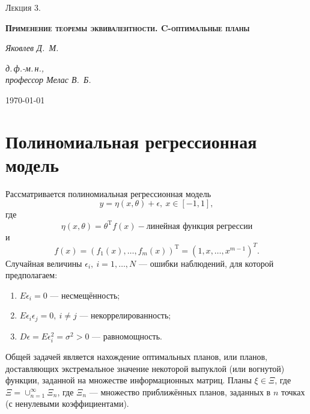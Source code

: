 \documentclass[12pt, a4paper]{article}
\begin{document}
	\begin{titlepage}
		\centering
		{\LARGE \textsc{Лекция 3.}\par}
		\vspace{1cm}
		{\Large \bfseries\textsc{Применение теоремы эквивалентности. C-оптимальные планы}\par}
		\vspace{1.5cm}
		{\Large\itshape Яковлев Д.~М.\par}
		\vspace{1cm}
		{\Large\itshape д.\,ф.-м.\,н.,\\профессор Мелас В.~Б.}
		\vfill
		
		{\large \today\par}
	\end{titlepage}
	\tableofcontents
	\newpage
	\section{Полиномиальная регрессионная модель}
	Рассматривается полиномиальная регрессионная модель
	\begin{equation*}
		y=\eta(x,\theta) + \epsilon,~x\in[-1, 1],
	\end{equation*}
	где
	\begin{equation*}
		\eta(x, \theta) = \theta^\mathrm{T}f(x) - \text{линейная функция регрессии}
	\end{equation*}
	и
	\begin{equation*}
		f(x)=( f_1(x),\dots, f_m(x))^\mathrm{T}=(1, x,\dots,x^{m-1})^T.
	\end{equation*}
	Случайная величины $\epsilon_i, ~i=1,\dots,N$ --- ошибки наблюдений, для которой предполагаем:
	\begin{enumerate}
		\item $E\epsilon_i = 0$ --- несмещённость;
		\item $E\epsilon_i\epsilon_j = 0,~i\not=j$ --- некоррелированность;
		\item $D\epsilon=E\epsilon_i^2=\sigma^2>0$ --- равномощность. 
	\end{enumerate}
	Общей задачей является нахождение оптимальных планов, или планов, доставляющих экстремальное значение некоторой выпуклой (или вогнутой) функции, заданной на множестве информационных матриц. Планы $\xi\in\Xi$, где $\Xi=\cup_{n=1}^\infty\Xi_n$, где $\Xi_n$ --- множество приближённых планов, заданных в $n$ точках (с ненулевыми коэффициентами).
	
\end{document}
